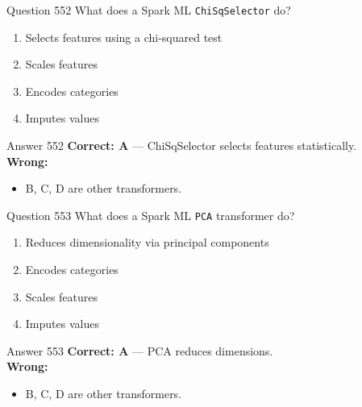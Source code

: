 \documentclass[aspectratio=169,11pt]{beamer}
\begin{document}
	\begin{frame}{Question 552}
		What does a Spark ML \texttt{ChiSqSelector} do?
		\begin{enumerate}[label=\Alph*.]
			\item Selects features using a chi-squared test
			\item Scales features
			\item Encodes categories
			\item Imputes values
		\end{enumerate}
	\end{frame}
	\begin{frame}{Answer 552}
		\textbf{Correct: A} --- ChiSqSelector selects features statistically.\\
		\vspace{0.5em}
		\textbf{Wrong:}
		\begin{itemize}
			\item B, C, D are other transformers.
		\end{itemize}
	\end{frame}
	
	\begin{frame}{Question 553}
		What does a Spark ML \texttt{PCA} transformer do?
		\begin{enumerate}[label=\Alph*.]
			\item Reduces dimensionality via principal components
			\item Encodes categories
			\item Scales features
			\item Imputes values
		\end{enumerate}
	\end{frame}
	\begin{frame}{Answer 553}
		\textbf{Correct: A} --- PCA reduces dimensions.\\
		\vspace{0.5em}
		\textbf{Wrong:}
		\begin{itemize}
			\item B, C, D are other transformers.
		\end{itemize}
	\end{frame}
	
\end{document}
